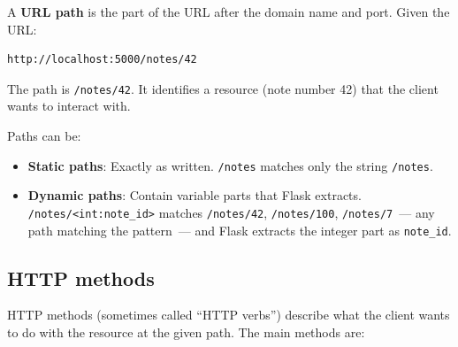 A \textbf{URL path} is the part of the URL after the domain name and port. Given the URL:

\begin{outputbox}[short]
\begin{Verbatim}[fontsize=\codesize, breaklines, breakanywhere, breaksymbolleft={\tiny\textcolor{muted}{$\hookrightarrow$}}]
http://localhost:5000/notes/42
\end{Verbatim}
\end{outputbox}

\noindent{}The path is \texttt{/notes/42}. It identifies a resource (note number 42) that the client wants to interact with.

Paths can be:

\begin{itemize}
\tightlist
\item
  \textbf{Static paths}: Exactly as written. \texttt{/notes} matches only the string \texttt{/notes}.
\item
  \textbf{Dynamic paths}: Contain variable parts that Flask extracts. \texttt{/}\allowbreak{}\texttt{notes/}\allowbreak{}\texttt{\textless{}int:note\_id\textgreater{}} matches \texttt{/notes/42}, \texttt{/notes/100}, \texttt{/notes/7}~--- any path matching the pattern~--- and Flask extracts the integer part as \texttt{note\_id}.
\end{itemize}

\subsection*{HTTP methods}\label{04-request-handling-paths:http-methods}

HTTP methods (sometimes called ``HTTP verbs'') describe what the client wants to do with the resource at the given path. The main methods are:


